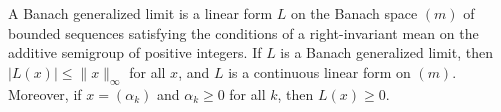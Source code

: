 A Banach generalized limit is a linear form $L$ on the Banach space $(m)$ of bounded sequences satisfying the conditions of a right-invariant mean on the additive semigroup of positive integers. If $L$ is a Banach generalized limit, then $|L(x)| \leq \|x\|_\infty$ for all $x$, and $L$ is a continuous linear form on $(m)$. Moreover, if $x = (\alpha_k)$ and $\alpha_k \geq 0$ for all $k$, then $L(x) \geq 0$.